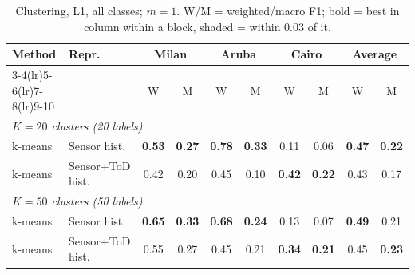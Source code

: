 \begin{table}[H]
\centering\small
\caption{Clustering, L1, all classes; $m=1$. W/M = weighted/macro F1; bold = best in column within a block, shaded = within 0.03 of it.}
\label{tab:clu_l1_all_m1}
\setlength{\tabcolsep}{3.5pt}
\begin{tabular}{llcc|cc|cc|cc}
\toprule
Method & Repr. & \multicolumn{2}{c}{Milan} & \multicolumn{2}{c}{Aruba} & \multicolumn{2}{c}{Cairo} & \multicolumn{2}{c}{Average} \\
\cmidrule(lr){3-4}\cmidrule(lr){5-6}\cmidrule(lr){7-8}\cmidrule(lr){9-10}
 & & W & M & W & M & W & M & W & M \\
\midrule
\multicolumn{10}{l}{\textit{$K = 20$ clusters (20 labels)}} \\
\midrule
k-means & Sensor hist. & \cellcolor{blue!12}\textbf{0.53} & \cellcolor{blue!12}\textbf{0.27} & \cellcolor{blue!12}\textbf{0.78} & \cellcolor{blue!12}\textbf{0.33} & 0.11 & 0.06 & \cellcolor{blue!12}\textbf{0.47} & \cellcolor{blue!12}\textbf{0.22} \\
k-means & Sensor+ToD hist. & 0.42 & 0.20 & 0.45 & 0.10 & \cellcolor{blue!12}\textbf{0.42} & \cellcolor{blue!12}\textbf{0.22} & 0.43 & 0.17 \\
\midrule
\multicolumn{10}{l}{\textit{$K = 50$ clusters (50 labels)}} \\
\midrule
k-means & Sensor hist. & \cellcolor{blue!12}\textbf{0.65} & \cellcolor{blue!12}\textbf{0.33} & \cellcolor{blue!12}\textbf{0.68} & \cellcolor{blue!12}\textbf{0.24} & 0.13 & 0.07 & \cellcolor{blue!12}\textbf{0.49} & \cellcolor{blue!12}0.21 \\
k-means & Sensor+ToD hist. & 0.55 & 0.27 & 0.45 & \cellcolor{blue!12}0.21 & \cellcolor{blue!12}\textbf{0.34} & \cellcolor{blue!12}\textbf{0.21} & 0.45 & \cellcolor{blue!12}\textbf{0.23} \\
\bottomrule
\end{tabular}
\end{table}

